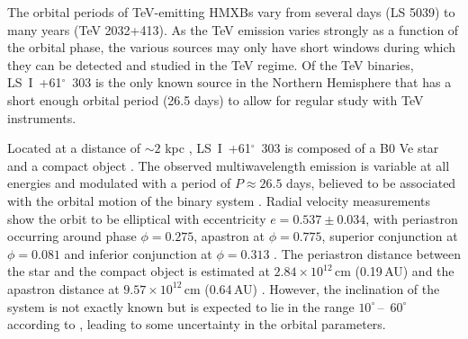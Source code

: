 \documentclass[preprint2]{aastex}
\newcommand{\lsi}{LS~I~+61$^{\circ}$~303}
\begin{document}
The orbital periods of TeV-emitting HMXBs vary from several days (LS 5039) to many years (TeV 2032+413). As the TeV emission varies strongly as a function of the orbital phase, the various sources may only have short windows during which they can be detected and studied in the TeV regime. Of the TeV binaries, \lsi{} is the only known source in the Northern Hemisphere that has a short enough orbital period (26.5 days) to allow for regular study with TeV instruments. 

Located at a distance of $\sim2$ kpc \citep{1991AJ....101.2126F}, \lsi{} is composed of a B0 Ve star and a compact object \citep{HandC1981, Casares2005}. The observed multiwavelength emission is variable at all energies and modulated with a period of $P \approx 26.5$ days, believed to be associated with the orbital motion of the binary system \citep{1982ApJ...255..210T, 1994A&A...288..519P, 1997A&A...320L..25P, Esposito2007, Abdo2009, Albert2006,  VERITASLSIDetection}. Radial velocity measurements show the orbit to be elliptical with eccentricity $e = 0.537\pm0.034$, with periastron occurring around phase $\phi=0.275$, apastron at $\phi=0.775$, superior conjunction at $\phi=0.081$ and inferior conjunction at $\phi=0.313$ \citep{Aragona2009}. The periastron distance between the star and the compact object is estimated at $2.84 \times 10^{12}$\,cm (0.19\,AU) and the apastron distance at $9.57 \times 10^{12}$\,cm (0.64\,AU) \citep{2013A&ARv..21...64D}. However, the inclination of the system is not exactly known but is expected to lie in the range $10^\circ$\,--~$60^\circ$ according to \citet{Casares2005}, leading to some uncertainty in the orbital parameters.

\end{document}

